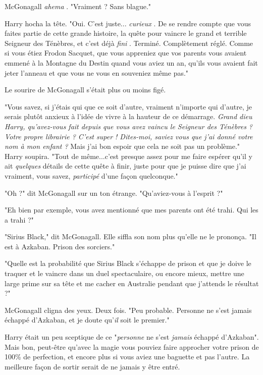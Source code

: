 McGonagall \emph{ahema} . "Vraiment ? Sans blague."

Harry hocha la tête. "Oui. C'est juste... \emph{curieux} . De se rendre compte que vous faites partie de cette grande histoire, la quête pour vaincre le grand et terrible Seigneur des Ténèbres, et c'est déjà \emph{fini} . Terminé. Complètement réglé. Comme si vous étiez Frodon Sacquet, que vous appreniez que vos parents vous avaient emmené à la Montagne du Destin quand vous aviez un an, qu'ils vous avaient fait jeter l'anneau et que vous ne vous en souveniez même pas."

Le sourire de McGonagall s'était plus ou moins figé.

"Vous savez, si j'étais qui que ce soit d'autre, vraiment n'importe qui d'autre, je serais plutôt anxieux à l'idée de vivre à la hauteur de ce démarrage. \emph{Grand dieu Harry, qu'avez-vous fait depuis que vous avez vaincu le Seigneur des Ténèbres ? Votre propre librairie ? C'est super ! Dites-moi, saviez vous que j'ai donné votre nom à mon enfant ? } Mais j'ai bon espoir que cela ne soit pas un problème." Harry soupira. "Tout de même...c'est presque assez pour me faire espérer qu'il y ait \emph{quelques}  détails de cette quête à finir, juste pour que je puisse dire que j'ai vraiment, vous savez, \emph{participé}  d'une façon quelconque."

"Oh ?" dit McGonagall sur un ton étrange. "Qu'aviez-vous à l'esprit ?"

"Eh bien par exemple, vous avez mentionné que mes parents ont été trahi. Qui les a trahi ?"

"Sirius Black," dit McGonagall. Elle siffla son nom plus qu'elle ne le prononça. "Il est à Azkaban. Prison des sorciers."

"Quelle est la probabilité que Sirius Black s'échappe de prison et que je doive le traquer et le vaincre dans un duel spectaculaire, ou encore mieux, mettre une large prime sur sa tête et me cacher en Australie pendant que j'attends le résultat ?"

McGonagall cligna des yeux. Deux fois. "Peu probable. Personne ne s'est jamais échappé d'Azkaban, et je doute qu'\emph{il}  soit le premier."

Harry était un peu sceptique de ce "\emph{personne}  ne s'est \emph{jamais}  échappé d'Azkaban". Mais bon, peut-être qu'avec la magie vous pouviez faire approcher votre prison de 100\% de perfection, et encore plus si vous aviez une baguette et pas l'autre. La meilleure façon de sortir serait de ne jamais y être entré.

